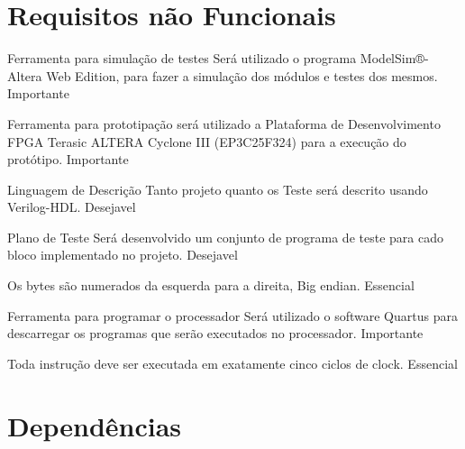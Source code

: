 \documentclass{article}
\begin{document}
\section{Requisitos não Funcionais}

  \begin{nonfunctional}

    \requirement
    {Ferramenta para simulação de testes}
    {Será utilizado o programa ModelSim®-Altera Web Edition, para fazer a simulação dos módulos e testes dos mesmos.}
    {Importante}

    \requirement
    {Ferramenta para prototipação}
    {será utilizado a Plataforma de Desenvolvimento FPGA  Terasic ALTERA Cyclone III (EP3C25F324) para a execução do protótipo.}
    {Importante}

    \requirement
    {Linguagem de Descrição}
    {Tanto projeto quanto os Teste será descrito usando Verilog-HDL.}
    {Desejavel}

    \requirement
    {Plano de Teste}
    {Será desenvolvido um conjunto de programa de teste para cado bloco implementado no projeto. }
    {Desejavel}

    {Os bytes são numerados da esquerda para a direita, Big endian.}
    {Essencial}

    \requirement
    {Ferramenta para programar o processador}
    {Será utilizado o software Quartus para descarregar os programas que serão executados no processador.}
    {Importante}


      {Toda instrução deve ser executada em exatamente cinco ciclos de clock.}
      {Essencial}

  \end{nonfunctional}

\section{Dependências}

  \begin{dependencies}
\end{dependencies}

% 
% 
\end{document}
